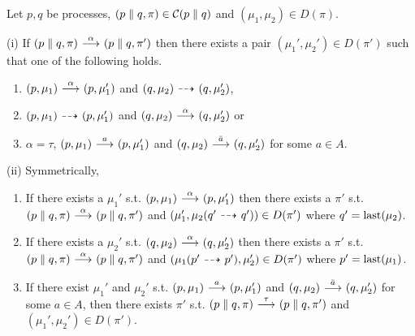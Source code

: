 \begin{lemma}\label{lemma:last_step_decomp}
    Let $p,q$ be processes, $(p\parallel q, \pi)\in\mathcal{C}(p\parallel q)$ and
    $(\mu_1,\mu_2)\in D(\pi)$.

    \noindent (i) If $(p\parallel q, \pi) \ {\stackrel{{\alpha}}{\longrightarrow}}\  (p\parallel q, \pi')$
    then there exists a pair $(\mu_1', \mu_2')\in D(\pi')$ such that one of the following
    holds.
    \begin{enumerate}
        \item $(p,\mu_1) \ {\stackrel{{\alpha}}{\longrightarrow}}\  (p,\mu_1')$ and $(q,\mu_2) \ {\stackrel{_{}}{\dashrightarrow}}\  (q,\mu_2')$,
        \item $(p,\mu_1) \ {\stackrel{_{}}{\dashrightarrow}}\  (p,\mu_1')$ and $(q,\mu_2) \ {\stackrel{{\alpha}}{\longrightarrow}}\  (q,\mu_2')$ or
        \item $\alpha = \tau$, $(p,\mu_1) \ {\stackrel{{a}}{\longrightarrow}}\  (p,\mu_1')$ and $(q,\mu_2) \ {\stackrel{{\bar{a}}}{\longrightarrow}}\  (q,\mu_2')$ for some $a\in A$.
    \end{enumerate}

    \noindent (ii) Symmetrically,
    \begin{enumerate}
        \item If there exists a $\mu_1'$ s.t. $(p, \mu_1) \ {\stackrel{{\alpha}}{\longrightarrow}}\  (p,\mu_1')$
            then there exists a $\pi'$ s.t. $(p\parallel q, \pi) \ {\stackrel{{\alpha}}{\longrightarrow}}\ 
            (p\parallel q, \pi')$ and $(\mu_1', \mu_2(q'\ {\stackrel{_{}}{\dashrightarrow}}\ q')) \in D(\pi')$
            where $q' = \operatorname{last}(\mu_2)$.
        \item If there exists a $\mu_2'$ s.t. $(q, \mu_2) \ {\stackrel{{\alpha}}{\longrightarrow}}\  (q,\mu_2')$
            then there exists a $\pi'$ s.t. $(p\parallel q, \pi) \ {\stackrel{{\alpha}}{\longrightarrow}}\ 
            (p\parallel q, \pi')$ and $(\mu_1(p' \ {\stackrel{_{}}{\dashrightarrow}}\  p'), \mu_2') \in D(\pi')$
            where $p' = \operatorname{last}(\mu_1)$.
        \item If there exist $\mu_1'$ and $\mu_2'$ s.t. $(p,\mu_1) \ {\stackrel{{a}}{\longrightarrow}}\  (p,\mu_1')$
            and $(q,\mu_2) \ {\stackrel{{\bar{a}}}{\longrightarrow}}\  (q,\mu_2')$ for some $a\in A$, then there
            exists $\pi'$ s.t. $(p\parallel q, \pi) \ {\stackrel{{\tau}}{\longrightarrow}}\  (p\parallel q, \pi')$
            and $(\mu_1', \mu_2') \in D(\pi')$.
    \end{enumerate}
\end{lemma}
